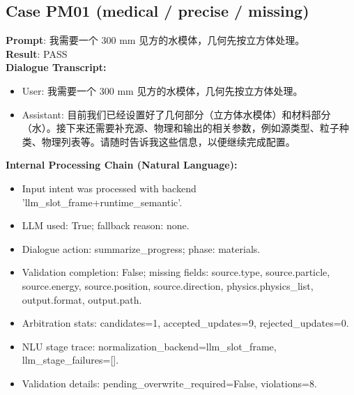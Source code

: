 \documentclass[11pt]{ctexart}
\begin{document}
\subsection{Case PM01 (medical / precise / missing)}
\textbf{Prompt}: 我需要一个 300 mm 见方的水模体，几何先按立方体处理。\\
\textbf{Result}: PASS\\
\textbf{Dialogue Transcript:}
\begin{itemize}
\item User: 我需要一个 300 mm 见方的水模体，几何先按立方体处理。
\item Assistant: 目前我们已经设置好了几何部分（立方体水模体）和材料部分（水）。接下来还需要补充源、物理和输出的相关参数，例如源类型、粒子种类、物理列表等。请随时告诉我这些信息，以便继续完成配置。
\end{itemize}
\textbf{Internal Processing Chain (Natural Language):}
\begin{itemize}
\item Input intent was processed with backend 'llm\_slot\_frame+runtime\_semantic'.
\item LLM used: True; fallback reason: none.
\item Dialogue action: summarize\_progress; phase: materials.
\item Validation completion: False; missing fields: source.type, source.particle, source.energy, source.position, source.direction, physics.physics\_list, output.format, output.path.
\item Arbitration stats: candidates=1, accepted\_updates=9, rejected\_updates=0.
\item NLU stage trace: normalization\_backend=llm\_slot\_frame, llm\_stage\_failures=[].
\item Validation details: pending\_overwrite\_required=False, violations=8.
\end{itemize}
\end{document}

